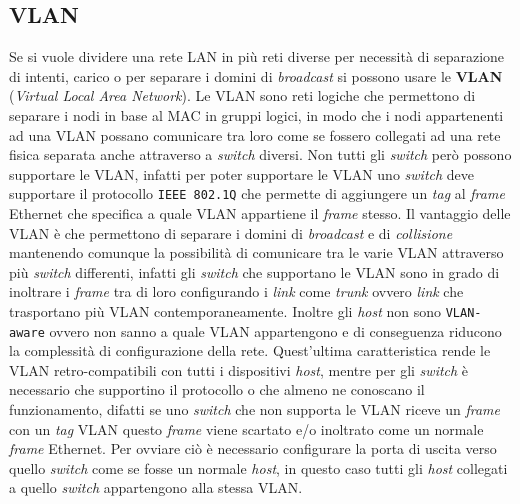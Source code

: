     \subsection[\textit{Virtual Local Area Network} (\texttt*{VLAN})]{\acrfull*{VLAN}}
        Se si vuole dividere una rete \Acrshort*{LAN} in più reti diverse per necessità di separazione di intenti, carico o per separare i domini di \textit{broadcast} si possono usare le \textbf{VLAN} (\textit{Virtual Local Area Network}).\newline
        Le \Acrshort*{VLAN} sono reti logiche che permettono di separare i nodi in base al \Acrshort*{MAC} in gruppi logici, in modo che i nodi appartenenti ad una \Acrshort*{VLAN} possano comunicare tra loro come se fossero collegati ad una rete fisica separata anche attraverso a \textit{switch} diversi.\newline
        Non tutti gli \textit{switch} però possono supportare le \Acrshort*{VLAN}, infatti per poter supportare le \Acrshort*{VLAN} uno \textit{switch} deve supportare il protocollo \texttt{\Acrshort*{IEEE} 802.1Q} che permette di aggiungere un \textit{tag} al \textit{frame} Ethernet che specifica a quale \Acrshort*{VLAN} appartiene il \textit{frame} stesso.\newline
        Il vantaggio delle \Acrshort*{VLAN} è che permettono di separare i domini di \textit{broadcast} e di \textit{collisione} mantenendo comunque la possibilità di comunicare tra le varie \Acrshort*{VLAN} attraverso più \textit{switch} differenti, infatti gli \textit{switch} che supportano le \Acrshort*{VLAN} sono in grado di inoltrare i \textit{frame} tra di loro configurando i \textit{link} come \textit{trunk} ovvero \textit{link} che trasportano più \Acrshort*{VLAN} contemporaneamente. Inoltre gli \textit{host} non sono \texttt{VLAN-aware} ovvero non sanno a quale \Acrshort*{VLAN} appartengono e di conseguenza riducono la complessità di configurazione della rete.\newline
        Quest'ultima caratteristica rende le \Acrshort*{VLAN} retro-compatibili con tutti i dispositivi \textit{host}, mentre per gli \textit{switch} è necessario che supportino il protocollo o che almeno ne conoscano il funzionamento, difatti se uno \textit{switch} che non supporta le \Acrshort*{VLAN} riceve un \textit{frame} con un \textit{tag} \Acrshort*{VLAN} questo \textit{frame} viene scartato e/o inoltrato come un normale \textit{frame} Ethernet. Per ovviare ciò è necessario configurare la porta di uscita verso quello \textit{switch} come se fosse un normale \textit{host}, in questo caso tutti gli \textit{host} collegati a quello \textit{switch} appartengono alla stessa \Acrshort*{VLAN}.
